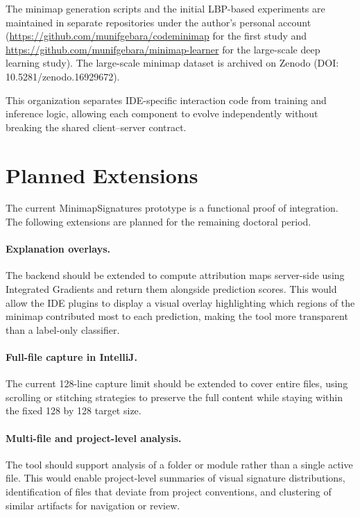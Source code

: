 The minimap generation scripts and the initial LBP-based experiments are
maintained in separate repositories under the author's personal account
(\url{https://github.com/munifgebara/codeminimap} for the first study and
\url{https://github.com/munifgebara/minimap-learner} for the large-scale deep
learning study). The large-scale minimap dataset is archived on Zenodo
(DOI: 10.5281/zenodo.16929672).

This organization separates IDE-specific interaction code from training and
inference logic, allowing each component to evolve independently without
breaking the shared client--server contract.

\section{Planned Extensions}

The current MinimapSignatures prototype is a functional proof of integration.
The following extensions are planned for the remaining doctoral period.

\paragraph{Explanation overlays.}
The backend should be extended to compute attribution maps server-side using
Integrated Gradients and return them alongside prediction scores. This would
allow the IDE plugins to display a visual overlay highlighting which regions of
the minimap contributed most to each prediction, making the tool more
transparent than a label-only classifier.

\paragraph{Full-file capture in IntelliJ.}
The current 128-line capture limit should be extended to cover entire files,
using scrolling or stitching strategies to preserve the full content while
staying within the fixed 128 by 128 target size.

\paragraph{Multi-file and project-level analysis.}
The tool should support analysis of a folder or module rather than a single
active file. This would enable project-level summaries of visual signature
distributions, identification of files that deviate from project conventions,
and clustering of similar artifacts for navigation or review.

